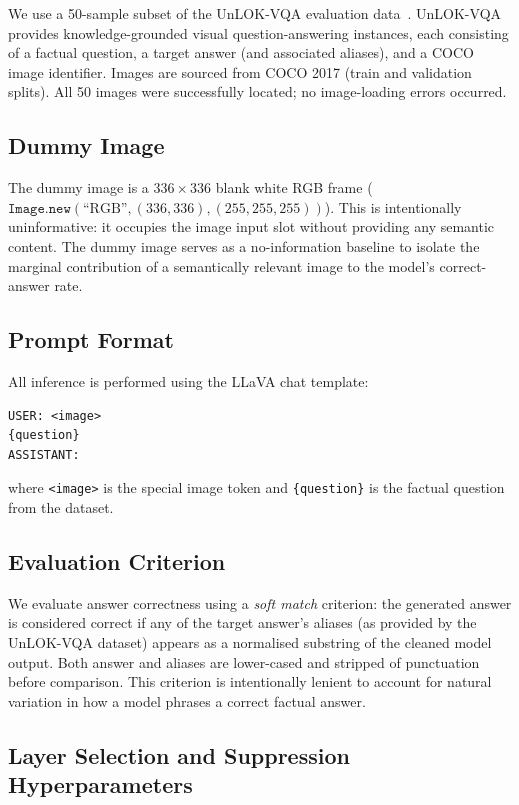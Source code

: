 \documentclass[12pt, a4paper]{article}
\begin{document}
We use a 50-sample subset of the UnLOK-VQA evaluation data~\citep{unlok2025}.
UnLOK-VQA provides knowledge-grounded visual question-answering instances, each
consisting of a factual question, a target answer (and associated aliases), and a COCO
image identifier.
Images are sourced from COCO 2017 (train and validation splits).
All 50 images were successfully located; no image-loading errors occurred.

\subsection{Dummy Image}

The dummy image is a $336 \times 336$ blank white RGB frame
($\mathtt{Image.new}(\text{``RGB''}, (336, 336), (255, 255, 255))$).
This is intentionally uninformative: it occupies the image input slot without providing
any semantic content.
The dummy image serves as a no-information baseline to isolate the marginal contribution
of a semantically relevant image to the model's correct-answer rate.

\subsection{Prompt Format}

All inference is performed using the LLaVA chat template:
\begin{verbatim}
USER: <image>
{question}
ASSISTANT:
\end{verbatim}
where \texttt{<image>} is the special image token and \texttt{\{question\}} is the
factual question from the dataset.

\subsection{Evaluation Criterion}
\label{sec:setup:eval}

We evaluate answer correctness using a \emph{soft match} criterion: the generated
answer is considered correct if any of the target answer's aliases (as provided by the
UnLOK-VQA dataset) appears as a normalised substring of the cleaned model output.
Both answer and aliases are lower-cased and stripped of punctuation before comparison.
This criterion is intentionally lenient to account for natural variation in how a model
phrases a correct factual answer.

\subsection{Layer Selection and Suppression Hyperparameters}
\end{document}
